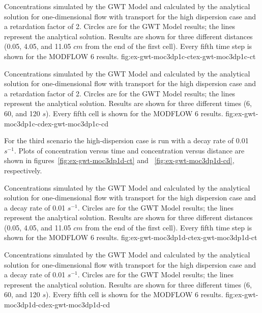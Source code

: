 \begin{StandardFigure}{
                                     Concentrations simulated by the \mf GWT Model and calculated by the analytical solution for one-dimensional flow with transport for the high dispersion case and a retardation factor of 2.  Circles are for the GWT Model results; the lines represent the analytical solution.  Results are shown for three different distances (0.05, 4.05, and 11.05 $cm$ from the end of the first cell).  Every fifth time step is shown for the MODFLOW 6 results.
                                     }{fig:ex-gwt-moc3dp1c-ct}{ex-gwt-moc3dp1c-ct}
\end{StandardFigure}            

\begin{StandardFigure}{
                                     Concentrations simulated by the \mf GWT Model and calculated by the analytical solution for one-dimensional flow with transport for the high dispersion case and a retardation factor of 2.  Circles are for the GWT Model results; the lines represent the analytical solution.  Results are shown for three different times (6, 60, and 120 $s$).  Every fifth cell is shown for the MODFLOW 6 results.
                                     }{fig:ex-gwt-moc3dp1c-cd}{ex-gwt-moc3dp1c-cd}
\end{StandardFigure}            

For the third scenario the high-dispersion case is run with a decay rate of 0.01 $s^{-1}$.  Plots of concentration versus time and concentration versus distance are shown in figures~\ref{fig:ex-gwt-moc3dp1d-ct} and ~\ref{fig:ex-gwt-moc3dp1d-cd}, respectively.

\begin{StandardFigure}{
                                     Concentrations simulated by the \mf GWT Model and calculated by the analytical solution for one-dimensional flow with transport for the high dispersion case and a decay rate of 0.01 $s^{-1}$.  Circles are for the GWT Model results; the lines represent the analytical solution.  Results are shown for three different distances (0.05, 4.05, and 11.05 $cm$ from the end of the first cell).  Every fifth time step is shown for the MODFLOW 6 results.
                                     }{fig:ex-gwt-moc3dp1d-ct}{ex-gwt-moc3dp1d-ct}
\end{StandardFigure}            

\begin{StandardFigure}{
                                     Concentrations simulated by the \mf GWT Model and calculated by the analytical solution for one-dimensional flow with transport for the high dispersion case and a decay rate of 0.01 $s^{-1}$.  Circles are for the GWT Model results; the lines represent the analytical solution.  Results are shown for three different times (6, 60, and 120 $s$).  Every fifth cell is shown for the MODFLOW 6 results.
                                     }{fig:ex-gwt-moc3dp1d-cd}{ex-gwt-moc3dp1d-cd}
\end{StandardFigure}            

